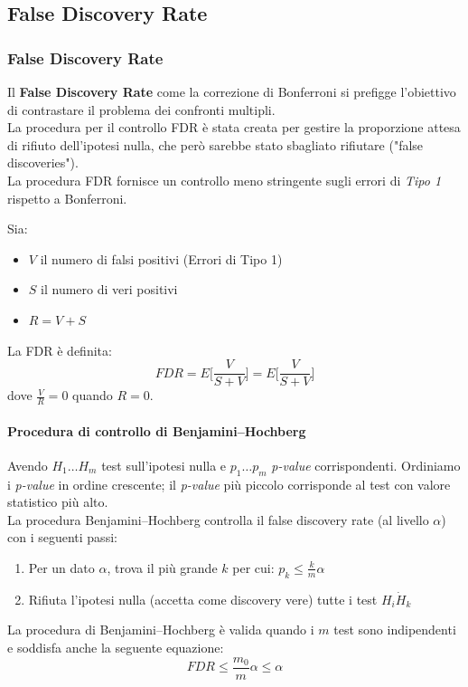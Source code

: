 \documentclass{beamer}
\begin{document}
\subsection{False Discovery Rate}
\begin{frame}
\frametitle{False Discovery Rate}
Il \textbf{False Discovery Rate} come la correzione di Bonferroni si prefigge l'obiettivo di contrastare il problema dei confronti multipli.\\
\smallskip
La procedura per il controllo FDR è stata creata per gestire la proporzione attesa di rifiuto dell'ipotesi nulla,  che però sarebbe stato sbagliato rifiutare ("false discoveries").\\
\smallskip
La procedura FDR fornisce un controllo meno stringente sugli errori di \textit{Tipo 1} rispetto a Bonferroni.
\end{frame}

\begin{frame}
Sia:
\begin{itemize}
\item $V$ il numero di falsi positivi (Errori di Tipo 1)
\item $S$ il numero di veri positivi 
\item $R =  V+S$ 
\end{itemize}
La FDR è definita:
\begin{equation*}
FDR = E\Big[\frac{V}{S+V}\Big] = E\Big[\frac{V}{S+V}\Big]
\end{equation*}
dove $\frac{V}{R} = 0$ quando $R = 0$.
\end{frame}

\begin{frame}
\framesubtitle{Procedura di controllo di Benjamini–Hochberg}
Avendo $H_1 \dots H_m$ test sull'ipotesi nulla e $p_1 \dots p_m$ \textit{p-value} corrispondenti. Ordiniamo i \textit{p-value} in ordine crescente; il \textit{p-value} più piccolo corrisponde al test con valore statistico più alto.\\
\smallskip
La procedura Benjamini–Hochberg controlla il false discovery rate (al livello $\alpha$) con i seguenti passi:\\
\medskip
\begin{enumerate}
\item Per un dato $\alpha$, trova il più grande $k$ per cui: $p_k \leq \frac{k}{m}\alpha$
\item Rifiuta l'ipotesi nulla (accetta come discovery vere) tutte i test $H_i \dot H_k$
\end{enumerate}
La procedura di Benjamini–Hochberg è valida quando i $m$ test sono indipendenti e soddisfa anche la seguente equazione:
\begin{equation*}
FDR \leq \frac{m_0}{m}\alpha \leq \alpha
\end{equation*}
\end{frame}
\end{document}
